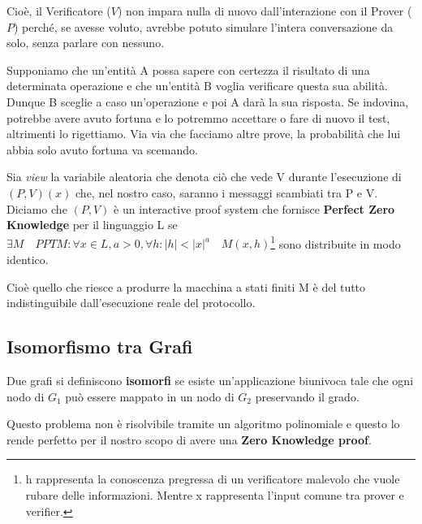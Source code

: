 Cioè, il Verificatore ($V$) non impara nulla di nuovo dall'interazione con il Prover ($P$) perché, se avesse voluto, avrebbe potuto simulare l'intera conversazione da solo, senza parlare con nessuno.

Supponiamo che un'entità A possa sapere con certezza il risultato di una determinata operazione e che un'entità B voglia verificare questa sua abilità. Dunque B sceglie a caso un'operazione e poi A darà la sua risposta. Se indovina, potrebbe avere avuto fortuna e lo potremmo accettare o fare di nuovo il test, altrimenti lo rigettiamo. Via via che facciamo altre prove, la probabilità che lui abbia solo avuto fortuna va scemando. 

Sia \textit{view} la variabile aleatoria che denota ciò che vede V durante l'esecuzione di $(P,V)(x)$ che, nel nostro caso, saranno i messaggi scambiati tra P e V. Diciamo che $(P,V)$ è un interactive proof system che fornisce \textbf{Perfect Zero Knowledge} per il linguaggio L se $\exists M \quad PPTM:\forall x \in L, a > 0, \forall h: |h| < |x|^a \quad M(x,h)$\footnote{h rappresenta la conoscenza pregressa di un verificatore malevolo che vuole rubare delle informazioni. Mentre x rappresenta l'input comune tra prover e verifier.} sono distribuite in modo identico. 

Cioè quello che riesce a produrre la macchina a stati finiti M è del tutto indistinguibile dall'esecuzione reale del protocollo.    

\subsection{Isomorfismo tra Grafi}
Due grafi si definiscono \textbf{isomorfi} se esiste un'applicazione biunivoca tale che ogni nodo di $G_1$ può essere mappato in un nodo di $G_2$ preservando il grado.  

Questo problema non è risolvibile tramite un algoritmo polinomiale e questo lo rende perfetto per il nostro scopo di avere una \textbf{Zero Knowledge proof}.


